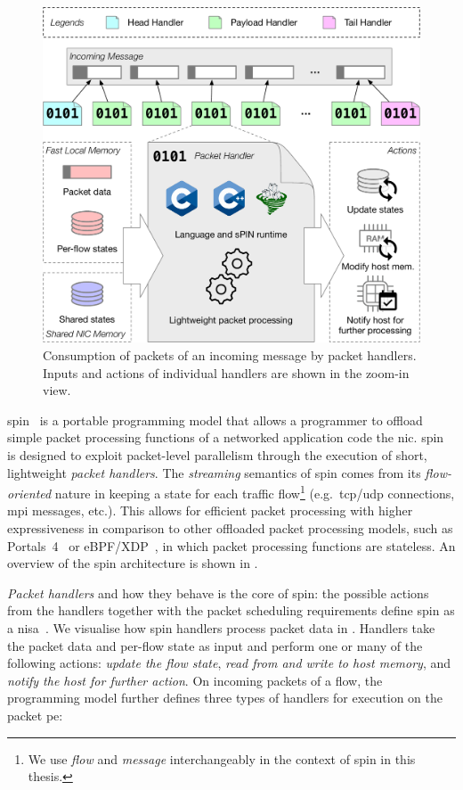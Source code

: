 \begin{figure}[tp]
    \centering
    \includegraphics[width=.85\textwidth]{figures/spin-handlers.pdf}
    \caption{Consumption of packets of an incoming message by packet handlers.  Inputs and actions of individual handlers are shown in the zoom-in view.} \label{fig:spin-handlers}
\end{figure}

\ac{spin}~\cite{hoefler_spin_2017} is a portable programming model that allows a programmer to offload simple packet processing functions of a networked application code the \ac{nic}.  \ac{spin} is designed to exploit packet-level parallelism through the execution of short, lightweight \textit{packet handlers}.  The \emph{streaming} semantics of \ac{spin} comes from its \emph{flow-oriented} nature in keeping a state for each traffic flow\footnote{We use \emph{flow} and \emph{message} interchangeably in the context of \ac{spin} in this thesis.} (e.g.\ \acs{tcp}/\acs{udp} connections, \acs{mpi} messages, etc.).  This allows for efficient packet processing with higher expressiveness in comparison to other offloaded packet processing models, such as Portals~4~\cite{bosshart_p4_2014} or eBPF/XDP~\cite{vieira_fast_2021}, in which packet processing functions are stateless.  An overview of the \ac{spin} architecture is shown in .

\emph{Packet handlers} and how they behave is the core of \ac{spin}: the possible actions from the handlers together with the packet scheduling requirements define \ac{spin} as a \ac{nisa}~\cite{hoefler_spin_2017}.  We visualise how \ac{spin} handlers process packet data in .  Handlers take the packet data and per-flow state as input and perform one or many of the following actions: \emph{update the flow state}, \emph{read from and write to host memory}, and \emph{notify the host for further action}.  On incoming packets of a flow, the programming model further defines three types of handlers for execution on the packet \ac{pe}:

